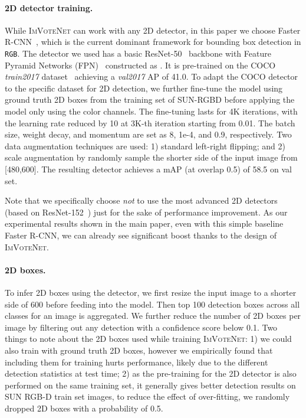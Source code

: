 \documentclass[10pt,twocolumn,letterpaper]{article}
\newcommand{\imvotenet}{\textsc{ImVoteNet}\xspace}
\newcommand{\ours}{\imvotenet}
\newcommand{\rgb}{\texttt{RGB}\xspace}
\begin{document}
\paragraph{2D detector training.} While \ours can work with any 2D detector, in this paper we choose Faster R-CNN~\cite{ren2015faster}, which is the current dominant framework for bounding box detection in \rgb. The detector we used has a basic ResNet-50~\cite{he2016deep} backbone with Feature Pyramid Networks (FPN)~\cite{lin2017feature} constructed as . It is pre-trained on the COCO \emph{train2017} dataset~\cite{lin2014microsoft} achieving a \emph{val2017} AP of 41.0. To adapt the COCO detector to the specific dataset for 2D detection, we further fine-tune the model using ground truth 2D boxes from the training set of SUN-RGBD before applying the model only using the color channels. The fine-tuning lasts for 4K iterations, with the learning rate reduced by 10 at 3K-th iteration starting from 0.01. The batch size, weight decay, and momentum are set as 8, 1e-4, and 0.9, respectively. Two data augmentation techniques are used: 1) standard left-right flipping; and 2) scale augmentation by randomly sample the shorter side of the input image from [480,600]. The resulting detector achieves a mAP (at overlap 0.5) of 58.5 on val set.

Note that we specifically choose \emph{not} to use the most advanced 2D detectors (\eg based on ResNet-152~\cite{he2016deep}) just for the sake of performance improvement. As our experimental results shown in the main paper, even with this simple baseline Faster R-CNN, we can already see significant boost thanks to the design of \ours.

\paragraph{2D boxes.} To infer 2D boxes using the detector, we first resize the input image to a shorter side of 600 before feeding into the model. Then top 100 detection boxes across all classes for an image is aggregated. We further reduce the number of 2D boxes per image by filtering out any detection with a confidence score below 0.1. Two things to note about the 2D boxes used while training \ours: 1) we could also train with ground truth 2D boxes, however we empirically found that including them for training hurts performance, likely due to the different detection statistics at test time; 2) as the pre-training for the 2D detector is also performed on the same training set, it generally gives better detection results on SUN RGB-D train set images, to reduce the effect of over-fitting, we randomly dropped 2D boxes with a probability of 0.5. 
\end{document}
